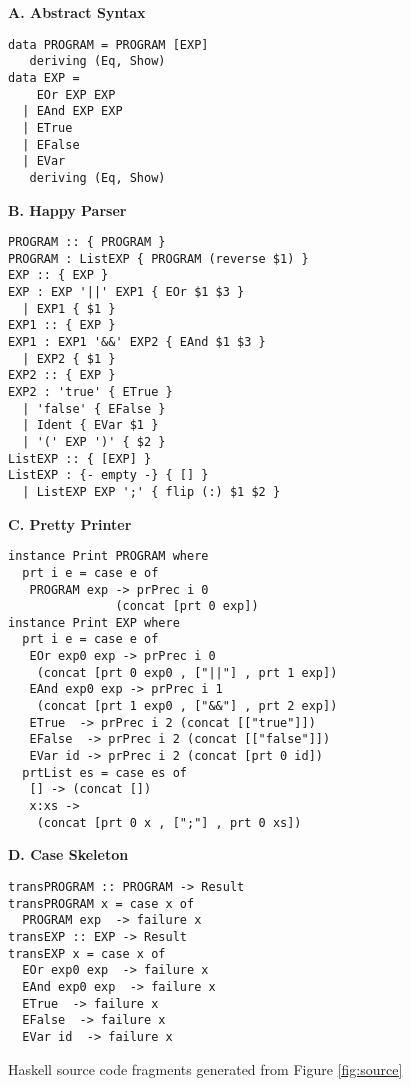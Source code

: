 \begin{figure}
\begin{boxedminipage}[t]{\textwidth}
\begin{minipage}[l]{0.5\textwidth}

\textbf{A. Abstract Syntax}
\scriptsize
\begin{verbatim}
data PROGRAM = PROGRAM [EXP]
   deriving (Eq, Show)
data EXP =
    EOr EXP EXP
  | EAnd EXP EXP
  | ETrue
  | EFalse
  | EVar
   deriving (Eq, Show)
\end{verbatim}
\normalsize
\textbf{B. Happy Parser}

\scriptsize
\begin{verbatim}
PROGRAM :: { PROGRAM }
PROGRAM : ListEXP { PROGRAM (reverse $1) } 
EXP :: { EXP }
EXP : EXP '||' EXP1 { EOr $1 $3 } 
  | EXP1 { $1 }
EXP1 :: { EXP }
EXP1 : EXP1 '&&' EXP2 { EAnd $1 $3 } 
  | EXP2 { $1 }
EXP2 :: { EXP }
EXP2 : 'true' { ETrue } 
  | 'false' { EFalse }
  | Ident { EVar $1 }
  | '(' EXP ')' { $2 }
ListEXP :: { [EXP] }
ListEXP : {- empty -} { [] } 
  | ListEXP EXP ';' { flip (:) $1 $2 }
\end{verbatim}
\normalsize
\end{minipage}
\hfill
\begin{minipage}[r]{0.5\textwidth}

\textbf{C. Pretty Printer}

\scriptsize
\begin{verbatim}
instance Print PROGRAM where
  prt i e = case e of
   PROGRAM exp -> prPrec i 0 
	           (concat [prt 0 exp])
instance Print EXP where
  prt i e = case e of
   EOr exp0 exp -> prPrec i 0 
    (concat [prt 0 exp0 , ["||"] , prt 1 exp])
   EAnd exp0 exp -> prPrec i 1 
    (concat [prt 1 exp0 , ["&&"] , prt 2 exp])
   ETrue  -> prPrec i 2 (concat [["true"]])
   EFalse  -> prPrec i 2 (concat [["false"]])
   EVar id -> prPrec i 2 (concat [prt 0 id])
  prtList es = case es of
   [] -> (concat [])
   x:xs -> 
    (concat [prt 0 x , [";"] , prt 0 xs])
\end{verbatim}
\normalsize

\textbf{D. Case Skeleton}

\scriptsize
\begin{verbatim}
transPROGRAM :: PROGRAM -> Result
transPROGRAM x = case x of
  PROGRAM exp  -> failure x
transEXP :: EXP -> Result
transEXP x = case x of
  EOr exp0 exp  -> failure x
  EAnd exp0 exp  -> failure x
  ETrue  -> failure x
  EFalse  -> failure x
  EVar id  -> failure x
\end{verbatim}
\hfill
\end{minipage}
\end{boxedminipage}
\caption{Haskell source code fragments generated from Figure \ref{fig:source}}
\label{fig:haskell}
\end{figure}

